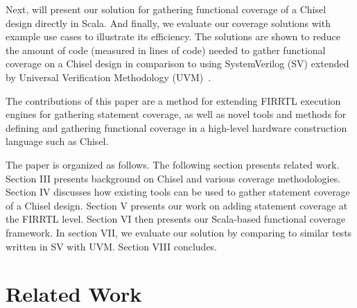 \documentclass[a4paper]{IEEEtran}
\newcommand{\martin}[1]{{\color{blue} Martin: #1}}
\begin{document}
Next, will present our solution for gathering functional coverage of a Chisel design directly in Scala. %
And finally, we evaluate our coverage solutions with example use cases to illustrate its efficiency. The solutions are shown to reduce the amount of code (measured in lines of code) needed to gather functional coverage on a Chisel design in comparison to using SystemVerilog (SV) extended by Universal Verification Methodology (UVM)~\cite{uvm2015}.

The contributions of this paper are a method for extending FIRRTL execution engines for gathering statement coverage, 
as well as novel tools and methods for defining and gathering functional coverage in a high-level hardware construction language such as Chisel.

The paper is organized as follows. 
The following section presents related work. 
Section III presents background on Chisel and various coverage methodologies. 
Section IV discusses how existing tools can be used to gather statement coverage of a Chisel design.  
Section V presents our work on adding statement coverage at the FIRRTL level. 
Section VI then presents our Scala-based functional coverage framework.  
In section VII, we evaluate our solution by comparing to similar tests written in SV with UVM. 
Section VIII concludes.

\section{Related Work}

\end{document}
